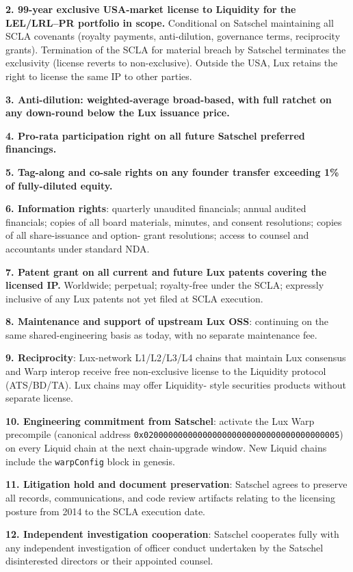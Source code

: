 \documentclass[11pt,letterpaper]{article}
\begin{document}
\textbf{2. 99-year exclusive USA-market license to Liquidity for
the LEL/LRL--PR portfolio in scope.} Conditional on Satschel
maintaining all SCLA covenants (royalty payments, anti-dilution,
governance terms, reciprocity grants). Termination of the SCLA for
material breach by Satschel terminates the exclusivity (license
reverts to non-exclusive). Outside the USA, Lux retains the right to
license the same IP to other parties.

\textbf{3. Anti-dilution: weighted-average broad-based, with full
ratchet on any down-round below the Lux issuance price.}

\textbf{4. Pro-rata participation right on all future Satschel
preferred financings.}

\textbf{5. Tag-along and co-sale rights on any founder transfer
exceeding 1\% of fully-diluted equity.}

\textbf{6. Information rights}: quarterly unaudited financials;
annual audited financials; copies of all board materials, minutes,
and consent resolutions; copies of all share-issuance and option-
grant resolutions; access to counsel and accountants under standard
NDA.

\textbf{7. Patent grant on all current and future Lux patents
covering the licensed IP.} Worldwide; perpetual; royalty-free under
the SCLA; expressly inclusive of any Lux patents not yet filed at
SCLA execution.

\textbf{8. Maintenance and support of upstream Lux OSS}: continuing
on the same shared-engineering basis as today, with no separate
maintenance fee.

\textbf{9. Reciprocity}: Lux-network L1/L2/L3/L4 chains that maintain
Lux consensus and Warp interop receive free non-exclusive license to
the Liquidity protocol (ATS/BD/TA). Lux chains may offer Liquidity-
style securities products without separate license.

\textbf{10. Engineering commitment from Satschel}: activate the Lux
Warp precompile (canonical address
\texttt{0x0200000000000000000000000000000000000005}) on every Liquid
chain at the next chain-upgrade window. New Liquid chains include
the \texttt{warpConfig} block in genesis.

\textbf{11. Litigation hold and document preservation}: Satschel
agrees to preserve all records, communications, and code review
artifacts relating to the licensing posture from 2014 to the SCLA
execution date.

\textbf{12. Independent investigation cooperation}: Satschel
cooperates fully with any independent investigation of officer
conduct undertaken by the Satschel disinterested directors or their
appointed counsel.
\end{document}
